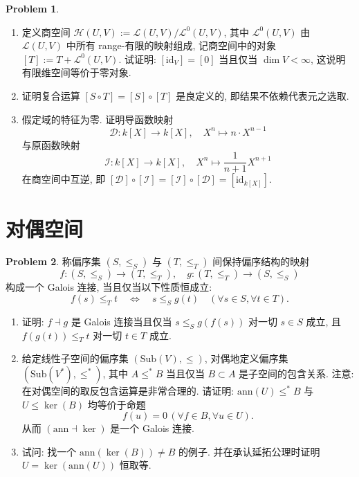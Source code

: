 \documentclass{MainStyle}
\theoremstyle{definition}
\newtheorem{problem}{Problem}
\begin{document}
\begin{problem}
\begin{enumerate}
    \item 定义商空间 $\mathcal H(U,V):={\mathcal L(U,V)}/{\mathcal L^0(U,V)}$, 其中 $\mathcal L^0(U,V)$ 由 $\mathcal L(U,V)$ 中所有 range-有限的映射组成, 记商空间中的对象 $[T]:=T+\mathcal L^0(U,V)$. 试证明: $[\mathrm{id}_V]=[0]$ 当且仅当 $\dim V<\infty$, 这说明有限维空间等价于零对象.
    \item 证明复合运算 $[S\circ T]=[S]\circ [T]$ 是良定义的, 即结果不依赖代表元之选取.
    \item 假定域的特征为零. 证明导函数映射
          \begin{equation}
              \mathcal D :k[X]\to k[X],\quad X^n\mapsto n\cdot X^{n-1}
          \end{equation}
          与原函数映射
          \begin{equation}
              \mathcal I :k[X]\to k[X],\quad X^n\mapsto \frac{1}{n+1} X^{n+1}
          \end{equation}
          在商空间中互逆, 即 $[\mathcal D]\circ [\mathcal I]= [\mathcal I]\circ [\mathcal D]=[\mathrm{id}_{k[X]}]$.
\end{enumerate}
\end{problem}

\newpage

\section{对偶空间}

\begin{problem}
称偏序集 $(S,\leq_S)$ 与 $(T,\leq _T)$ 间保持偏序结构的映射
\begin{equation}
    f:(S,\leq _S)\to (T,\leq _T),\quad g:(T,\leq _T)\to (S,\leq _S)
\end{equation}
构成一个 Galois 连接, 当且仅当以下性质恒成立:
\begin{equation}
    f(s)\leq_T t\quad \Longleftrightarrow \quad s\leq_S g(t)\quad (\forall s\in S, \forall t\in T).
\end{equation}
\begin{enumerate}
    \item 证明: $f\dashv g$ 是 Galois 连接当且仅当 $s\leq _S g(f(s))$ 对一切 $s\in S$ 成立, 且 $f(g(t))\leq _Tt$ 对一切 $t\in T$ 成立.
    \item 给定线性子空间的偏序集 $(\mathrm{Sub}(V),\leq )$, 对偶地定义偏序集 $(\mathrm{Sub}(V^\ast),\leq ^\ast)$, 其中 $A\leq ^\ast B$ 当且仅当 $B\subset A$ 是子空间的包含关系. 注意: 在对偶空间的取反包含运算是非常合理的. 请证明: $\mathrm{ann}(U) \leq ^\ast B$ 与 $U\leq \ker(B)$ 均等价于命题
          \begin{equation}
              f(u)=0\,(\forall f\in B,\forall u\in U).
          \end{equation}
          从而 $(\mathrm{ann}\dashv \ker )$ 是一个 Galois 连接.
    \item 试问: 找一个 $\mathrm{ann}(\ker (B))\neq B$ 的例子. 并在承认延拓公理时证明 $U=\ker (\mathrm{ann}(U))$ 恒取等.
\end{enumerate}
\end{problem}
\end{document}
